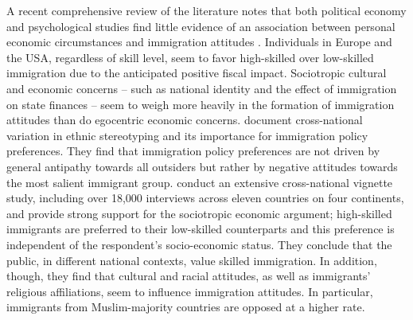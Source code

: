 \documentclass[12pt]{article}
\begin{document}
\par A recent comprehensive review of the literature notes that both political economy and psychological studies find little evidence of an association between personal economic circumstances and immigration attitudes \citep{Hainmuelleretal2014}. Individuals in Europe and the USA, regardless of skill level, seem to favor high-skilled over low-skilled immigration due to the anticipated positive fiscal impact. Sociotropic cultural and economic concerns -- such as national identity and the effect of immigration on state finances -- seem to weigh more heavily in the formation of immigration attitudes than do egocentric economic concerns. \citet{Konitzeretal2018} document cross-national variation in ethnic stereotyping and its importance for immigration policy preferences. They find that immigration policy preferences are not driven by general antipathy towards all outsiders but rather by negative attitudes towards the most salient immigrant group. \citet{Valentino2017} conduct an extensive cross-national vignette study, including over 18,000 interviews across eleven countries on four continents, and provide strong support for the sociotropic economic argument; high-skilled immigrants are preferred to their low-skilled counterparts and this preference is independent of the respondent's socio-economic status. They conclude that the public, in different national contexts, value skilled immigration. In addition, though, they find that cultural and racial attitudes, as well as immigrants' religious affiliations, seem to influence immigration attitudes. In particular, immigrants from Muslim-majority countries are opposed at a higher rate. 

\end{document}
